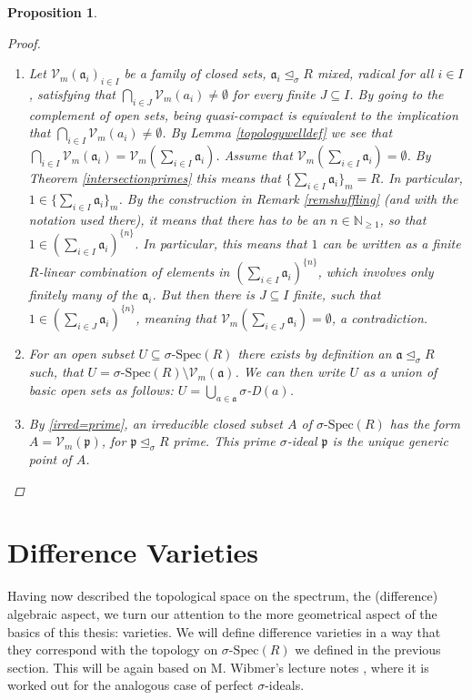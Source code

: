 \documentclass{article}
\def\NE{\mathbb{N}_{\geq1}}
\def\Vm{\mathcal{V}_m}
\def\a{\mathfrak{a}}
\def\p{\mathfrak{p}}
\def\s{\sigma}
\def\si{\unlhd_{\sigma}}
\def\sSpec{\sigma\text{-Spec}}
\newenvironment{bew}{\begin{proof}[Proof]}{\end{proof}}
\theoremstyle{plain}
\newtheorem{prop}[Satz]{Proposition}
\theoremstyle{definition}
\begin{document}
\begin{prop}
\begin{bew}
\begin{enumerate}
\item Let $\Vm(\a_i)_{i \in I}$ be a family of closed sets, $\a_i \si R$ mixed, radical for all $i \in I$, satisfying that 
$\bigcap_{i \in J} \Vm( a_i) \neq \emptyset$ for every finite $J \subseteq I$. By  going to the complement of open sets, being quasi-compact is equivalent to the implication that $\bigcap_{i \in I} \Vm(a_i) \neq \emptyset$.
By Lemma \ref{topologywelldef} we see that $\bigcap_{i \in I} \Vm( \a_i) = \Vm ( \sum_{i \in I} \a_i)$. Assume that $ \Vm ( \sum_{i \in I} \a_i) = \emptyset$. 
By Theorem \ref{intersectionprimes} this means that $\{ \sum_{i \in I} \a_i \}_m = R$. In particular, $1 \in \{ \sum_{i \in I} \a_i \}_m$. By the construction in Remark \ref{remshuffling} (and with the notation used there), it means that there has to be an $n \in \NE$,
so that $1 \in (\sum_{i \in I} \a_i )^{\{n\}}$. In particular, this means that $1$ can be written as a finite $R$-linear combination of elements in $(\sum_{i \in I} \a_i )^{\{n\}}$, which involves only finitely many of the $\a_i$.
But then there is $J \subseteq I$ finite, such that $1 \in (\sum_{i \in J} \a_i)^{\{n\}}$, meaning that $\Vm(\sum_{i \in J} \a_i) = \emptyset$, a contradiction. 
\item For an open subset $U \subseteq \sSpec(R)$ there exists by definition an $\a \si R$ such, that $U = \sSpec(R) \setminus \Vm(\a)$. We can then write $U$ as a union of basic open sets as follows: $U = \bigcup_{a \in \a} \s$-D$(a)$.
\item By \ref{irred=prime}, an irreducible closed subset $A$ of $\sSpec(R)$ has the form $A = \Vm(\p)$, for $\p \si R$ prime. This prime $\s$-ideal $\p$ is the unique generic point of $A$.
\end{enumerate}
\end{bew}
\end{prop}

\clearpage
\section{Difference Varieties}


Having now described the topological space on the spectrum, the (difference) algebraic aspect, we turn our attention to the more geometrical aspect of the basics of this thesis: varieties.
We will define difference varieties in a way that they correspond with the topology on $\sSpec(R)$ we defined in the previous section. This will be again based on M. Wibmer's lecture notes \cite{wibmer}, 
where it is worked out for the analogous case of perfect $\s$-ideals.
\end{document}
